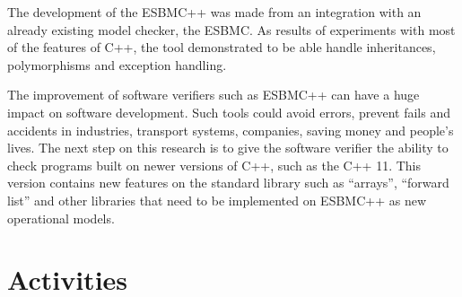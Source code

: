 \documentclass[11pt]{article}
\begin{document}
\setlength{\parindent}{10ex}The development of the ESBMC++ was made from an integration with an already existing model checker, the ESBMC. As results of experiments with most of the features of C++, the tool demonstrated to be able handle inheritances, polymorphisms and exception handling.\par 

\setlength{\parindent}{10ex}The improvement of software verifiers such as ESBMC++ can have a huge impact on software development. Such tools could avoid errors, prevent fails and accidents in industries, transport systems, companies, saving money and people’s lives. The next step on this research is to give the software verifier the ability to check programs built on newer versions of C++, such as the C++ 11. This version contains new features on the standard library such as “arrays”, “forward list” and other libraries that need to be implemented on ESBMC++ as new operational models.\par 


\section{Activities}
\end{document}
